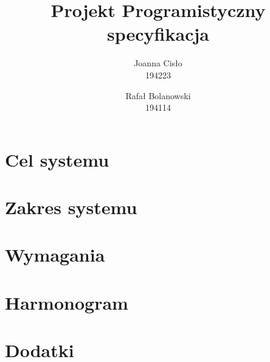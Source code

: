 \documentclass[a4paper,12pt]{article}
\begin{document}
\author{Joanna Cisło\\194223 \and Rafał Bolanowski\\194114}
\title{Projekt Programistyczny\\specyfikacja}
\maketitle

\section*{Cel systemu}


\section*{Zakres systemu}


\section*{Wymagania}


\section*{Harmonogram}


\section*{Dodatki}

\end{document}
